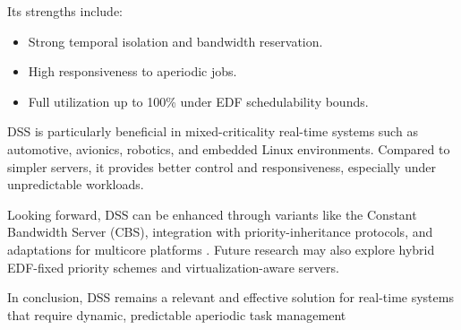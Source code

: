 \documentclass[conference]{IEEEtran}
\begin{document}
Its strengths include:
\begin{itemize}
    \item Strong temporal isolation and bandwidth reservation.
    \item High responsiveness to aperiodic jobs.
    \item Full utilization up to 100\% under EDF schedulability bounds.
\end{itemize}

DSS is particularly beneficial in mixed-criticality real-time systems such as automotive, avionics, robotics, and embedded Linux environments. Compared to simpler servers, it provides better control and responsiveness, especially under unpredictable workloads.

Looking forward, DSS can be enhanced through variants like the Constant Bandwidth Server (CBS), integration with priority-inheritance protocols, and adaptations for multicore platforms \cite{laplante2011real}. Future research may also explore hybrid EDF-fixed priority schemes and virtualization-aware servers.

In conclusion, DSS remains a relevant and effective solution for real-time systems that require dynamic, predictable aperiodic task management


\printbibliography


\vspace{12pt}
\color{red}
\end{document}
